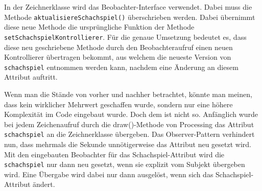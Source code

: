 In der Zeichnerklasse wird das Beobachter-Interface verwendet.
Dabei muss die Methode \texttt{aktualisiereSchachspiel()} überschrieben werden. 
Dabei übernimmt diese neue Methode die ursprüngliche Funktion der Methode \texttt{setSchachspielKontrollierer}.
Für die genaue Umsetzung bedeutet es, dass diese neu geschriebene Methode durch den Beobachteraufruf einen neuen Kontrollierer übertragen bekommt, aus welchem die neueste Version von \texttt{schachspiel} entnommen werden kann, nachdem eine Änderung an diesem Attribut auftritt. 

Wenn man die Stände von vorher und nachher betrachtet, könnte man meinen, dass kein wirklicher Mehrwert geschaffen wurde, sondern nur eine höhere Komplexität im Code eingebaut wurde. 
Doch dem ist nicht so. 
Anfänglich wurde bei jedem Zeichenaufruf durch die draw()-Methode von Processing das Attribut \texttt{schachspiel} an die Zeichnerklasse übergeben. 
Das Observer-Pattern verhindert nun, dass mehrmals die Sekunde unnötigerweise das Attribut neu gesetzt wird. 
Mit den eingebauten Beobachter für das Schachspiel-Attribut wird die \texttt{schachspiel} nur dann neu gesetzt, wenn sie explizit vom Subjekt übergeben wird.
Eine Übergabe wird dabei nur dann ausgelöst, wenn sich das Schachspiel-Attribut ändert. 
